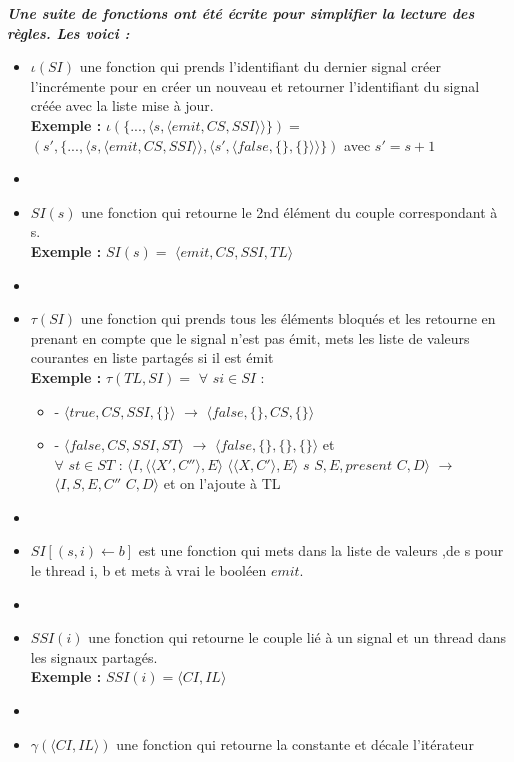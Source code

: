\documentclass[10pt,a4paper]{article}
\begin{document}
		\textbf{\textit{Une suite de fonctions ont été écrite pour simplifier la lecture des règles. Les voici :}}
		\smallbreak
		\begin{itemize}
			\item[] $\iota(SI)$ une fonction qui prends l'identifiant du dernier signal créer l'incrémente pour en créer un nouveau et retourner l'identifiant du signal créée avec la liste mise à jour.
			\\ \textbf{Exemple :} $\iota(\{...,\langle s,\langle emit,CS,SSI\rangle\rangle\}) =$ $(s' ,\{...,\langle s,\langle emit,CS,SSI\rangle\rangle,\langle s',\langle false,\{\},\{\}\rangle\rangle\})$ avec $s' = s+1$
			\item[] 
			\item[] $SI(s)$ une fonction qui retourne le 2nd élément du couple correspondant à s.
			\\\textbf{Exemple :} $SI(s) =$ $\langle emit,CS,SSI,TL\rangle$
			\item[]  
			\item[] $\tau(SI)$ une fonction qui prends tous les éléments bloqués et les retourne en prenant en compte que le signal n'est pas émit, mets les liste de valeurs courantes en liste partagés si il est émit 
			\\ \textbf{Exemple :} $\tau(TL,SI) =$ $\forall$ $si \in SI$ : 
			\begin{itemize}
				\item[] - $\langle true,CS,SSI,\{\}\rangle$ $\rightarrow$ $\langle false,\{\},CS,\{\}\rangle$
				\item[] - $\langle false,CS,SSI,ST\rangle$ $\rightarrow$ $\langle false,\{\},\{\},\{\}\rangle$ et 
				\\$\forall$ $st \in ST$ : $\langle I,\langle\langle X',C''\rangle, E\rangle$ $\langle\langle X,C'\rangle, E\rangle$ $s$ $S,E,present$ $C,D\rangle$ $\rightarrow$ $ \langle I,S,E,C''$ $C,D\rangle$ et on l'ajoute à TL
			\end{itemize}
			\item[]
			\item[] $SI[(s,i) \leftarrow b]$ est une fonction qui mets dans la liste de valeurs ,de s pour le thread i, b et mets à vrai le booléen $emit$.
			\item[] 
			\item[] $SSI(i)$ une fonction qui retourne le couple lié à un signal et un thread dans les signaux partagés.
			\\ \textbf{Exemple :} $SSI(i) = \langle CI,IL\rangle$
			\item[] 
			\item[] $\gamma(\langle CI,IL\rangle)$ une fonction qui retourne la constante et décale l'itérateur 
		\end{itemize}
		\newpage
		
\end{document}
